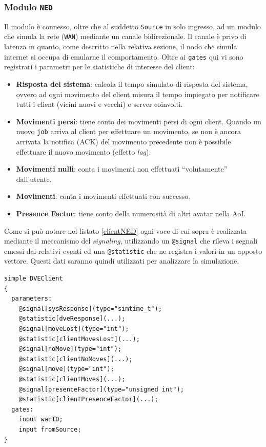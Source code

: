 \documentclass[a4paper, 11pt, oneside]{book}
\newcommand{\files}[1]{\texttt{#1}}
\theoremstyle{definition}
\theoremstyle{remark}
\begin{document}
\subsubsection{Modulo \files{NED}}
Il modulo è connesso, oltre che al suddetto \texttt{Source} in solo ingresso,
ad un modulo che simula la rete (\texttt{WAN}) mediante un canale bidirezionale.
Il canale è privo di latenza in quanto, come descritto nella relativa sezione,
il nodo che simula internet si occupa di emularne il comportamento.
Oltre ai \texttt{gates} qui vi sono registrati i parametri per le statistiche
di interesse del client:
\begin{itemize}
\item \textbf{Risposta del sistema}: calcola il tempo simulato di risposta
del sistema, ovvero ad ogni movimento del client misura il tempo impiegato
per notificare tutti i client (vicini nuovi e vecchi) e server coinvolti.
\item \textbf{Movimenti persi}: tiene conto dei movimenti persi di ogni client.
Quando un nuovo \texttt{job} arriva al client per effettuare un movimento, se
non è ancora arrivata la notifica (ACK) del movimento precedente non è possibile
effettuare il nuovo movimento (effetto \emph{lag}).
\item \textbf{Movimenti nulli}: conta i movimenti non effettuati ``volutamente''
dall'utente.
\item \textbf{Movimenti}: conta i movimenti effettuati con successo.
\item \textbf{Presence Factor}: tiene conto della numerosità di altri avatar
nella AoI.
\end{itemize}
Come si può notare nel listato \ref{clientNED} ogni voce di cui sopra è
realizzata mediante il meccanismo del \emph{signaling}, utilizzando un
\texttt{@signal} che rileva i segnali emessi dai relativi eventi
ed una \texttt{@statistic} che ne registra i valori in un apposto vettore.
Questi dati saranno quindi utilizzati per analizzare la simulazione.

\begin{lstlisting}[caption = {Il Modulo DVEClient.},
                   label = {clientNED}]
simple DVEClient
{
  parameters:
    @signal[sysResponse](type="simtime_t");
    @statistic[dveResponse](...);
    @signal[moveLost](type="int");
    @statistic[clientMovesLost](...);
    @signal[noMove](type="int");
    @statistic[clientNoMoves](...);
    @signal[move](type="int");
    @statistic[clientMoves](...);
    @signal[presenceFactor](type="unsigned int");
    @statistic[clientPresenceFactor](...);
  gates:
    inout wanIO;
    input fromSource;
}
\end{lstlisting}
\end{document}
